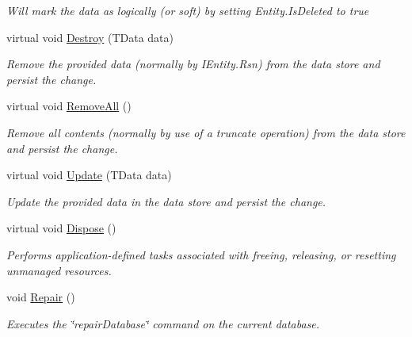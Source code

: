 \begin{DoxyCompactItemize}
\begin{DoxyCompactList}\small\item\em Will mark the {\itshape data}  as logically (or soft) by setting Entity.\+Is\+Deleted to true \end{DoxyCompactList}\item 
virtual void \hyperlink{classCqrs_1_1MongoDB_1_1DataStores_1_1MongoDbDataStore_a4650c780f34e320ba39f312e3b04555d_a4650c780f34e320ba39f312e3b04555d}{Destroy} (T\+Data data)
\begin{DoxyCompactList}\small\item\em Remove the provided {\itshape data}  (normally by I\+Entity.\+Rsn) from the data store and persist the change. \end{DoxyCompactList}\item 
virtual void \hyperlink{classCqrs_1_1MongoDB_1_1DataStores_1_1MongoDbDataStore_ac0cb8626e8f8ab0275a31e88a920ee3e_ac0cb8626e8f8ab0275a31e88a920ee3e}{Remove\+All} ()
\begin{DoxyCompactList}\small\item\em Remove all contents (normally by use of a truncate operation) from the data store and persist the change. \end{DoxyCompactList}\item 
virtual void \hyperlink{classCqrs_1_1MongoDB_1_1DataStores_1_1MongoDbDataStore_af86a3df56e2df92fb9ef880ff4fa5f16_af86a3df56e2df92fb9ef880ff4fa5f16}{Update} (T\+Data data)
\begin{DoxyCompactList}\small\item\em Update the provided {\itshape data}  in the data store and persist the change. \end{DoxyCompactList}\item 
virtual void \hyperlink{classCqrs_1_1MongoDB_1_1DataStores_1_1MongoDbDataStore_a5003aba35b02f686cbacf5832a14cf46_a5003aba35b02f686cbacf5832a14cf46}{Dispose} ()
\begin{DoxyCompactList}\small\item\em Performs application-\/defined tasks associated with freeing, releasing, or resetting unmanaged resources. \end{DoxyCompactList}\item 
void \hyperlink{classCqrs_1_1MongoDB_1_1DataStores_1_1MongoDbDataStore_a2fef1856a801d2f247ed5b0a0f3bea9a_a2fef1856a801d2f247ed5b0a0f3bea9a}{Repair} ()
\begin{DoxyCompactList}\small\item\em Executes the \char`\"{}repair\+Database\char`\"{} command on the current database. \end{DoxyCompactList}\end{DoxyCompactItemize}
